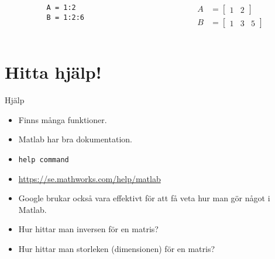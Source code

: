 \begin{frame}[fragile]
  \begin{example}
    \begin{columns}
      \begin{column}{0.4\columnwidth}
        \begin{verbatim}
          A = 1:2
          B = 1:2:6
        \end{verbatim}
      \end{column}
      \begin{column}{0.4\columnwidth}
        \begin{align*}
          A &= \begin{bmatrix}1 & 2\end{bmatrix} \\
          B &= \begin{bmatrix}1 & 3 & 5\end{bmatrix}
        \end{align*}
      \end{column}
    \end{columns}
  \end{example}
\end{frame}


\section{Hitta hjälp!}

\begin{frame}
  \begin{block}{Hjälp}
    \begin{itemize}
      \item Finns många funktioner.
      \item Matlab har bra dokumentation.
      \item \texttt{help command}
      \item \url{https://se.mathworks.com/help/matlab}
      \item Google brukar också vara effektivt för att få veta hur man gör 
        något i Matlab.
    \end{itemize}
  \end{block}

  \pause

  \begin{exercise}
    \begin{itemize}
      \item Hur hittar man inversen för en matris?
      \item Hur hittar man storleken (dimensionen) för en matris?
    \end{itemize}
  \end{exercise}
\end{frame}

